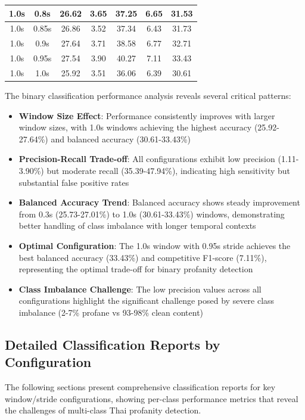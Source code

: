 \documentclass[11pt]{article}
\begin{document}
\begin{table}[H]
\begin{tabular}{|c|c|c|c|c|c|c|}
        \hline
        1.0s & 0.8s & 26.62 & 3.65 & 37.25 & 6.65 & 31.53 \\
        \hline
        1.0s & 0.85s & 26.86 & 3.52 & 37.34 & 6.43 & 31.73 \\
        \hline
        1.0s & 0.9s & 27.64 & 3.71 & 38.58 & 6.77 & 32.71 \\
        \hline
        1.0s & 0.95s & 27.54 & 3.90 & 40.27 & 7.11 & 33.43 \\
        \hline
        1.0s & 1.0s & 25.92 & 3.51 & 36.06 & 6.39 & 30.61 \\
        \hline
    \end{tabular}
\end{table}

The binary classification performance analysis reveals several critical patterns:

\begin{itemize}
    \item \textbf{Window Size Effect}: Performance consistently improves with larger window sizes, with 1.0s windows achieving the highest accuracy (25.92-27.64\%) and balanced accuracy (30.61-33.43\%)
    \item \textbf{Precision-Recall Trade-off}: All configurations exhibit low precision (1.11-3.90\%) but moderate recall (35.39-47.94\%), indicating high sensitivity but substantial false positive rates
    \item \textbf{Balanced Accuracy Trend}: Balanced accuracy shows steady improvement from 0.3s (25.73-27.01\%) to 1.0s (30.61-33.43\%) windows, demonstrating better handling of class imbalance with longer temporal contexts
    \item \textbf{Optimal Configuration}: The 1.0s window with 0.95s stride achieves the best balanced accuracy (33.43\%) and competitive F1-score (7.11\%), representing the optimal trade-off for binary profanity detection
    \item \textbf{Class Imbalance Challenge}: The low precision values across all configurations highlight the significant challenge posed by severe class imbalance (2-7\% profane vs 93-98\% clean content)
\end{itemize}

\subsection{Detailed Classification Reports by Configuration}
The following sections present comprehensive classification reports for key window/stride configurations, showing per-class performance metrics that reveal the challenges of multi-class Thai profanity detection.
\end{document}
